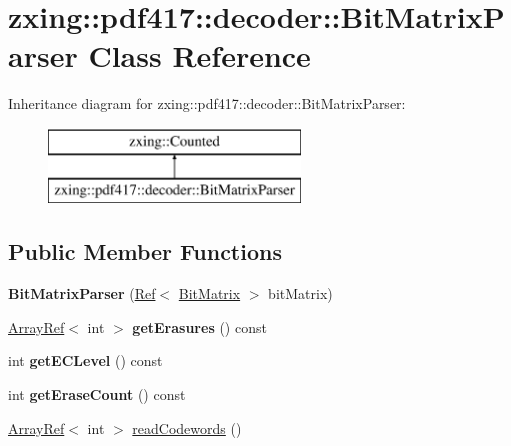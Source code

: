 \hypertarget{classzxing_1_1pdf417_1_1decoder_1_1_bit_matrix_parser}{}\section{zxing\+:\+:pdf417\+:\+:decoder\+:\+:Bit\+Matrix\+Parser Class Reference}
\label{classzxing_1_1pdf417_1_1decoder_1_1_bit_matrix_parser}
Inheritance diagram for zxing\+:\+:pdf417\+:\+:decoder\+:\+:Bit\+Matrix\+Parser\+:\begin{figure}[H]
\begin{center}
\leavevmode
\includegraphics[height=2.000000cm]{classzxing_1_1pdf417_1_1decoder_1_1_bit_matrix_parser}
\end{center}
\end{figure}
\subsection*{Public Member Functions}
\begin{DoxyCompactItemize}
\item 
\mbox{\label{classzxing_1_1pdf417_1_1decoder_1_1_bit_matrix_parser_a76e1fe4bb8cd208a5a2786ce00957ef7}} 
{\bfseries Bit\+Matrix\+Parser} (\mbox{\hyperlink{classzxing_1_1_ref}{Ref}}$<$ \mbox{\hyperlink{classzxing_1_1_bit_matrix}{Bit\+Matrix}} $>$ bit\+Matrix)
\item 
\mbox{\label{classzxing_1_1pdf417_1_1decoder_1_1_bit_matrix_parser_ad19c07dafdc8e767f0005e7517c40222}} 
\mbox{\hyperlink{classzxing_1_1_array_ref}{Array\+Ref}}$<$ int $>$ {\bfseries get\+Erasures} () const
\item 
\mbox{\label{classzxing_1_1pdf417_1_1decoder_1_1_bit_matrix_parser_aec6a86f32168563d04d305bb3fb647bf}} 
int {\bfseries get\+E\+C\+Level} () const
\item 
\mbox{\label{classzxing_1_1pdf417_1_1decoder_1_1_bit_matrix_parser_a2c9dc5d4d3c921db3679d65c8268923c}} 
int {\bfseries get\+Erase\+Count} () const
\item 
\mbox{\hyperlink{classzxing_1_1_array_ref}{Array\+Ref}}$<$ int $>$ \mbox{\hyperlink{classzxing_1_1pdf417_1_1decoder_1_1_bit_matrix_parser_a333c690ca4065e69b693202f2f0832c7}{read\+Codewords}} ()
\end{DoxyCompactItemize}
